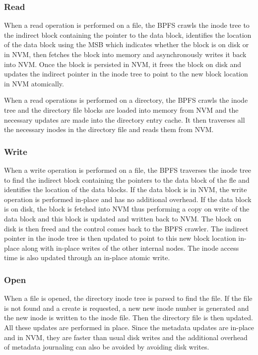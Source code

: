 \subsubsection{Read}
When a read operation is performed on a file, the BPFS crawls the inode tree to the indirect block containing the pointer to the data block, identifies the location of the data block using the MSB which indicates whether the block is on disk or in NVM, then fetches the block into memory and asynchronously writes it back into NVM. Once the block is persisted in NVM, it frees the block on disk and updates the indirect pointer in the inode tree to point to the new block location in NVM atomically.

When a read operations is performed on a directory, the BPFS crawls the inode tree and the directory file blocks are loaded into memory from NVM and the necessary updates are made into the directory entry cache. It then traverses all the necessary inodes in the directory file and reads them from NVM.
 
\subsubsection{Write}
When a write operation is performed on a file, the BPFS traverses the inode tree to find the indirect block containing the pointers to the data block of the fle and identifies the location of the data blocks. If the data block is in NVM, the write operation is performed in-place and has no additional overhead. If the data block is on disk, the block is fetched into NVM thus performing a copy on write of the data block and this block is updated and written back to NVM. The block on disk is then freed and the control comes back to the BPFS crawler. The indirect pointer in the inode tree is then updated to point to this new block location in-place along with in-place writes of the other internal nodes. The inode access time is also updated through an in-place atomic write.

\subsubsection{Open}
When a file is opened, the directory inode tree is parsed to find the file. If the file is not found and a create is requested, a new new inode nunber is generated and the new inode is written to the inode file. Then the directory file is then updated. All these updates are performed in place. Since the metadata updates are in-place and in NVM, they are faster than usual disk writes and the additional overhead of metadata journaling can also be avoided by avoiding disk writes.
